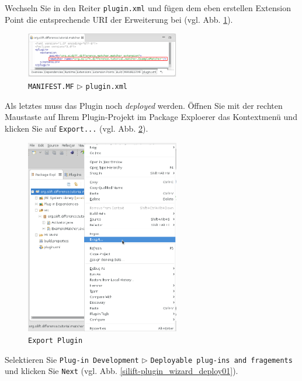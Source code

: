 \documentclass[a4paper]{scrartcl}
\begin{document}
Wechseln Sie in den Reiter \texttt{plugin.xml} und fügen dem eben erstellen Extension Point die entsprechende URI der Erweiterung bei (vgl. Abb. \ref{silift-plugin_manifest_plugin}).

\begin{figure}[H]
\centering
\includegraphics[width=0.6\textwidth]{graphics/silift-plugin_manifest_plugin.png}
\caption{\texttt{MANIFEST.MF} $\triangleright$ \texttt{plugin.xml}}
\label{silift-plugin_manifest_plugin}
\end{figure}

Als letztes muss das Plugin noch \textit{deployed} werden.
Öffnen Sie mit der rechten Maustaste auf Ihrem Plugin-Projekt im Package Exploerer das Kontextmenü und klicken Sie auf \texttt{Export...} (vgl. Abb. \ref{silift-plugin_contextmenu_export}).

\begin{figure}[H]
\centering
\includegraphics[width=0.6\textwidth]{graphics/silift-plugin_contextmenu_export.png}
\caption{\texttt{Export Plugin}}
\label{silift-plugin_contextmenu_export}
\end{figure}

Selektieren Sie \texttt{Plug-in Development} $\triangleright$ \texttt{Deployable plug-ins and fragements} und klicken Sie \texttt{Next} (vgl. Abb. \ref{silift-plugin_wizard_deploy01}).
\end{document}
